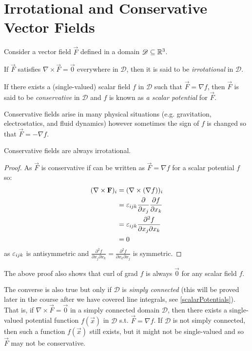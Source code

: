 \documentclass[../main.tex]{subfiles}
\begin{document}
\section{Irrotational and Conservative Vector Fields}
\label{conservativeFields}
Consider a vector field $\vec{F}$ defined in a domain $\mathscr{D} \subseteq \mathbb{R}^3$.
\begin{definition}[Irrotational]
If $\vec{F}$ satisfies $\nabla \times \vec{F} = \vec{0}$ everywhere in $\mathscr{D}$, then it is said to be \textit{irrotational} in $\mathscr{D}$.
\end{definition}
\begin{definition}[Conservative]
  \label{conservativeField}
  If there exists a (single-valued) scalar field $f$ in $\mathscr{D}$ such that $\vec{F} = \nabla f$, then $\vec{F}$ is said to be \textit{conservative} in $\mathscr{D}$ and $f$ is known as \textit{a scalar potential} for $\vec{F}$.
\end{definition}
\begin{remark}[Applications]
  Conservative fields arise in many physical situations (e.g. gravitation, electrostatics, and fluid dynamics) however sometimes the sign of $f$ is changed so that $\vec{F} = - \nabla f$.
\end{remark}
\begin{proposition}
  Conservative fields are always irrotational.
\end{proposition}
\begin{proof}
  As $\vec{F}$ is conservative if can be written as $\vec{F} = \nabla f$ for a scalar potential $f$ so:
  \begin{align*}
    (\nabla \times \vec{F})_i &= (\nabla \times (\nabla f))_i \\
                              &= \levi_{i j k} \pderiv{}{x_j} \pderiv{f}{x_k} \\
                              &= \levi_{i j k} \frac{\partial^2 f}{\partial x_j \partial x_k} \\
                              &= 0
  \end{align*}
  as $\varepsilon_{i j k}$ is antisymmetric and $\frac{\partial^2 f}{\partial x_j \partial x_k} = \frac{\partial^2 f}{\partial x_k \partial x_j}$ is symmetric.
\end{proof}
\begin{remark}
  The above proof also shows that curl of grad $f$ is always $\vec{0}$ for any scalar field $f$.
\end{remark}

The converse is also true but only if $\mathscr{D}$ is \textit{simply connected} (this will be proved later in the course after we have covered line integrals, see \cref{scalarPotentials}).
That is, if $\nabla \times \vec{F} = \vec{0}$ in a simply connected domain $\mathscr{D}$, then there exists a single-valued potential function $f(\vec{x})$ in $\mathscr{D}$ s.t. $\vec{F} = \nabla f$.
If $\mathscr{D}$ is not simply connected, then such a function $f(\vec{x})$ still exists, but it might not be single-valued and so $\vec{F}$ may not be conservative.
\end{document}
